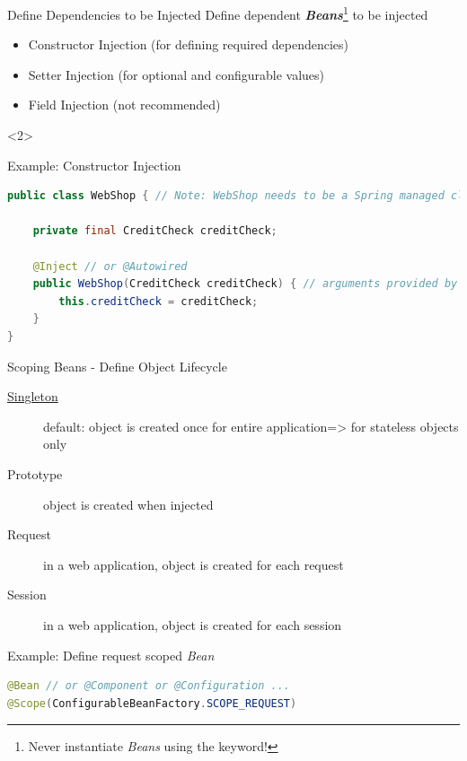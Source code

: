 \begin{frame}[fragile]{Define Dependencies to be Injected}
Define dependent \textbf{\emph{Beans}}\footnote{Never instantiate \emph{Beans} using the  keyword!} to be injected
\begin{itemize}
	\item Constructor Injection (for defining required dependencies)
	\item Setter Injection (for optional and configurable values)
	\item Field Injection (not recommended)
\end{itemize}
\vfill
\begin{visibleenv}<2>
\begin{block}{Example: Constructor Injection}
\begin{lstlisting}[language=Java,belowskip=0mm,aboveskip=0mm]
public class WebShop { // Note: WebShop needs to be a Spring managed class!

    private final CreditCheck creditCheck;
	
    @Inject // or @Autowired
    public WebShop(CreditCheck creditCheck) { // arguments provided by Spring
        this.creditCheck = creditCheck;
    }
}
\end{lstlisting}
\vspace{-5mm}	
\end{block}
\end{visibleenv}
\end{frame}

\begin{frame}[fragile]{Scoping Beans - Define Object Lifecycle}
\begin{description}
\item[\underline{Singleton}] default: object is created once for entire application\newline => for stateless objects only
\item[Prototype] object is created when injected
\item[Request] in a web application, object is created for each request
\item[Session] in a web application, object is created for each session
\end{description}
\vfill
\begin{block}{Example: Define request scoped \emph{Bean}}
\begin{lstlisting}[language=Java,belowskip=0mm,aboveskip=0mm]
@Bean // or @Component or @Configuration ...
@Scope(ConfigurableBeanFactory.SCOPE_REQUEST)
\end{lstlisting}
\vspace{-5mm}	
\end{block}
\end{frame}


